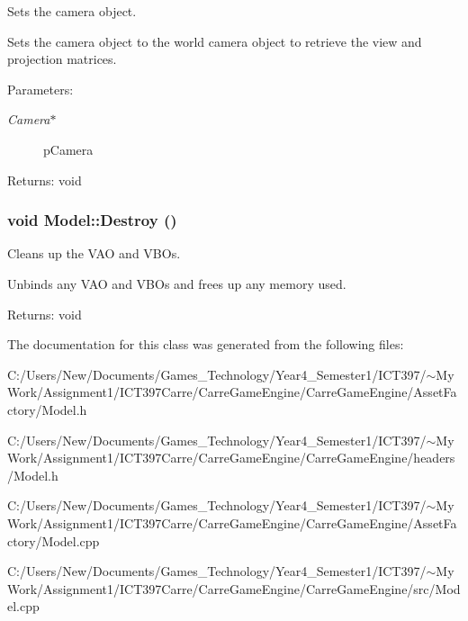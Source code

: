 Sets the camera object. 

Sets the camera object to the world camera object to retrieve the view and projection matrices.

\begin{Desc}
\item[Parameters:]
\begin{description}
\item[{\em Camera$\ast$}]pCamera \end{description}
\end{Desc}
\begin{Desc}
\item[Returns:]void \end{Desc}
\hypertarget{class_model_d60ed0ed7eaa7dcdd58398e6efacc7c4}{
\subsubsection[Destroy]{\setlength{\rightskip}{0pt plus 5cm}void Model::Destroy ()}}
\label{class_model_d60ed0ed7eaa7dcdd58398e6efacc7c4}


Cleans up the VAO and VBOs. 

Unbinds any VAO and VBOs and frees up any memory used.

\begin{Desc}
\item[Returns:]void \end{Desc}


The documentation for this class was generated from the following files:\begin{CompactItemize}
\item 
C:/Users/New/Documents/Games\_\-Technology/Year4\_\-Semester1/ICT397/$\sim$My Work/Assignment1/ICT397Carre/CarreGameEngine/CarreGameEngine/AssetFactory/Model.h\item 
C:/Users/New/Documents/Games\_\-Technology/Year4\_\-Semester1/ICT397/$\sim$My Work/Assignment1/ICT397Carre/CarreGameEngine/CarreGameEngine/headers/Model.h\item 
C:/Users/New/Documents/Games\_\-Technology/Year4\_\-Semester1/ICT397/$\sim$My Work/Assignment1/ICT397Carre/CarreGameEngine/CarreGameEngine/AssetFactory/Model.cpp\item 
C:/Users/New/Documents/Games\_\-Technology/Year4\_\-Semester1/ICT397/$\sim$My Work/Assignment1/ICT397Carre/CarreGameEngine/CarreGameEngine/src/Model.cpp\end{CompactItemize}
